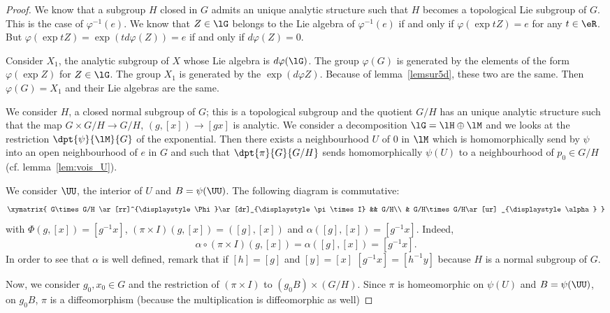 \begin{proof}
 We know that a subgroup $H$ closed in $G$ admits an unique analytic structure such that $H$ becomes a topological Lie subgroup of $G$. This is the case of $\varphi^{-1}(e)$. We know that $Z\in\lG$ belongs to the Lie algebra of $\varphi^{-1}(e)$ if and only if $\varphi(\exp tZ)=e$ for any $t\in\eR$. But $\varphi(\exp tZ)=\exp(td\varphi(Z))=e$ if and only if $d\varphi(Z)=0$.

Consider $X_1$, the analytic subgroup of $X$ whose Lie algebra is $d\varphi(\lG)$. The group $\varphi(G)$ is generated by the elements of the form $\varphi(\exp Z)$ for $Z\in\lG$. The group $X_1$ is generated by the $\exp(d\varphi Z)$. Because of lemma~\ref{lemsur5d}, these two are the same. Then $\varphi(G)=X_1$ and their Lie algebras are the same.

We consider $H$, a closed normal subgroup of $G$; this is a topological subgroup and the quotient $G/H$ has an unique analytic structure such that the map $G\times G/H\to G/H$, $(g,[x])\to [gx]$ is analytic. We consider a decomposition $\lG=\lH\oplus\lM$ and we looks at the restriction $\dpt{\psi}{\lM}{G}$ of the exponential. Then there exists a neighbourhood $U$ of $0$ in $\lM$ which is homomorphically send by  $\psi$ into an open neighbourhood of $e$ in $G$ and such that $\dpt{\pi}{G}{G/H}$ sends homomorphically $\psi(U)$ to a neighbourhood  of $p_0\in G/H$ (cf. lemma~\ref{lem:vois_U}).

We consider $\UU$, the interior of $U$ and $B=\psi(\UU)$. The following diagram is commutative:
\begin{equation}
 \xymatrix{
    G\times G/H  \ar[rr]^{\displaystyle\Phi}\ar[dr]_{\displaystyle \pi\times I} &&  G/H\\
     &     G/H\times G/H\ar[ur] _{\displaystyle\alpha}
  }
\end{equation}
with $\Phi(g,[x])=[g^{-1} x]$, $(\pi\times I)(g,[x])=([g],[x])$ and $\alpha([g],[x])=[g^{-1} x]$. Indeed,
\[
   \alpha\circ(\pi\times I)(g,[x])=\alpha([g],[x])=[g^{-1} x].
\]
In order to see that $\alpha$ is well defined, remark that if $[h]=[g]$ and $[y]=[x]$ $[g^{-1} x]=[h^{-1} y]$ because $H$ is a normal subgroup of $G$.

Now, we consider $g_0,x_0\in G$ and the restriction of $(\pi\times I)$ to $(g_0B)\times(G/H)$. Since $\pi$ is homeomorphic on $\psi(U)$ and $B=\psi(\UU)$, on $g_0B$, $\pi$ is a diffeomorphism (because the multiplication is diffeomorphic as well)


\end{proof}
